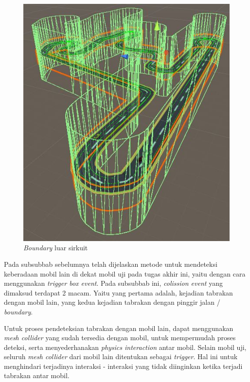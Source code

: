         \begin{figure}  [!htb]
	        \captionsetup{justification=centering}
	        \includegraphics[scale=0.7]{img/boundary-outside.JPG}
	        \caption{\textit{Boundary} luar sirkuit}
	        \label{fig: 3_24}
        \end{figure}
        
         Pada subsubbab sebelumnya telah dijelaskan metode untuk mendeteksi keberadaan mobil lain di dekat mobil uji pada tugas akhir ini, yaitu dengan cara menggunakan \textit{trigger box event}. Pada subsubbab ini, \textit{colission event} yang dimaksud terdapat 2 macam. Yaitu yang pertama adalah, kejadian tabrakan dengan mobil lain, yang kedua kejadian tabrakan dengan pinggir jalan / \textit{boundary}. 
         
         \par Untuk proses pendeteksian tabrakan dengan mobil lain, dapat menggunakan \textit{mesh collider} yang sudah tersedia dengan mobil, untuk mempermudah proses deteksi, serta menyederhanakan \textit{physics interaction} antar mobil. Selain mobil uji, seluruh \textit{mesh collider} dari mobil lain ditentukan sebagai \textit{trigger}. Hal ini untuk menghindari terjadinya interaksi - interaksi yang tidak diinginkan ketika terjadi tabrakan antar mobil. 
         

